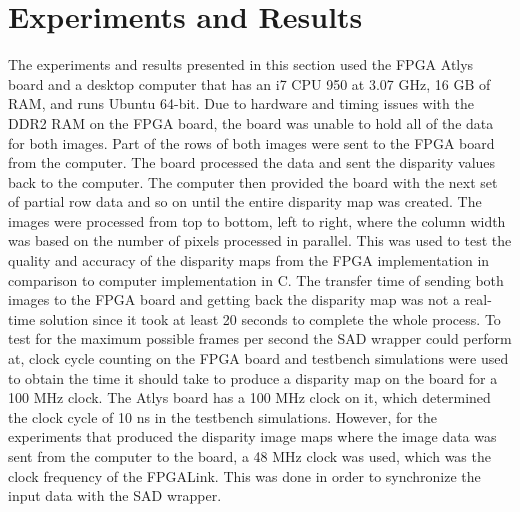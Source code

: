 \newcolumntype{+}{>{\global\let\currentrowstyle\relax}}
\newcolumntype{^}{>{\currentrowstyle}}
\newcommand{\rowstyle}[1]{\gdef\currentrowstyle{#1}%
#1\ignorespaces
}

\newcommand{\specialcell}[2][c]{%
  \begin{tabular}[#1]{@{}c@{}}#2\end{tabular}}

{}


\chapter{Experiments and Results}
\label{sec:exp}

The experiments and results presented in this section used the FPGA Atlys board and a desktop computer that has an i7 CPU 950 at 3.07 GHz, 16 GB of RAM, and runs Ubuntu 64-bit. Due to hardware and timing issues with the DDR2 RAM on the FPGA board, the board was unable to hold all of the data for both images. Part of the rows of both images were sent to the FPGA board from the computer. The board processed the data and sent the disparity values back to the computer. The computer then provided the board with the next set of partial row data and so on until the entire disparity map was created. The images were processed from top to bottom, left to right, where the column width was based on the number of pixels processed in parallel. This was used to test the quality and accuracy of the disparity maps from the FPGA implementation in comparison to computer implementation in C. The transfer time of sending both images to the FPGA board and getting back the disparity map was not a real-time solution since it took at least 20 seconds to complete the whole process. To test for the maximum possible frames per second the SAD wrapper could perform at, clock cycle counting on the FPGA board and testbench simulations were used to obtain the time it should take to produce a disparity map on the board for a 100 MHz clock. The Atlys board has a 100 MHz clock on it, which determined the clock cycle of 10 ns in the testbench simulations. However, for the experiments that produced the disparity image maps where the image data was sent from the computer to the board, a 48 MHz clock was used, which was the clock frequency of the FPGALink. This was done in order to synchronize the input data with the SAD wrapper. 

